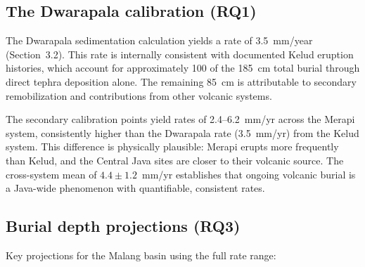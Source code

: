 \documentclass[12pt,a4paper]{article}
\begin{document}
\subsection{The Dwarapala calibration (RQ1)}

The Dwarapala sedimentation calculation yields a rate of 3.5~mm/year (Section~3.2). This rate is internally consistent with documented Kelud eruption histories, which account for approximately 100 of the 185~cm total burial through direct tephra deposition alone. The remaining 85~cm is attributable to secondary remobilization and contributions from other volcanic systems.

The secondary calibration points yield rates of 2.4--6.2~mm/yr across the Merapi system, consistently higher than the Dwarapala rate (3.5~mm/yr) from the Kelud system. This difference is physically plausible: Merapi erupts more frequently than Kelud, and the Central Java sites are closer to their volcanic source. The cross-system mean of $4.4 \pm 1.2$~mm/yr establishes that ongoing volcanic burial is a Java-wide phenomenon with quantifiable, consistent rates.

\subsection{Burial depth projections (RQ3)}

Key projections for the Malang basin using the full rate range:

\begin{table}[htbp]
\centering
\caption{Projected burial depth by era using empirically-derived sedimentation rates.}
\label{tab:depth}
\end{table}
\end{document}
